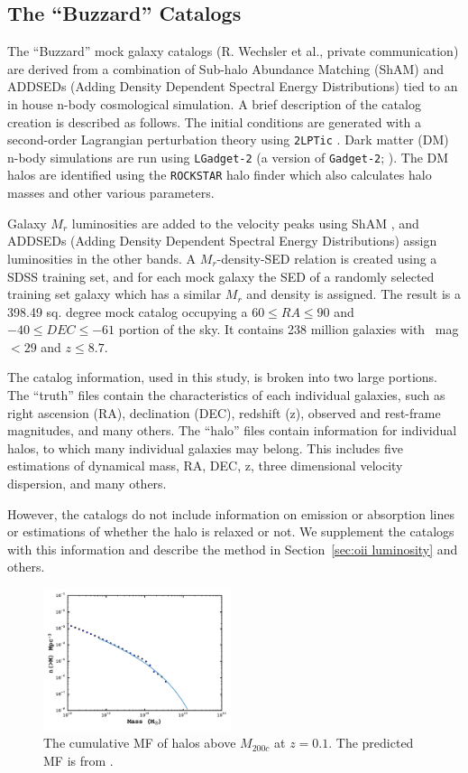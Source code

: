 \documentclass[apj, revtex4]{emulateapj}
\begin{document}
\subsection{The ``Buzzard'' Catalogs}
The ``Buzzard'' mock galaxy catalogs (R. Wechsler et al., private communication) are derived from a combination of Sub-halo Abundance Matching (ShAM) and ADDSEDs (Adding Density Dependent Spectral Energy Distributions) tied to an in house n-body cosmological simulation. A brief description of the catalog creation is described as follows. The initial conditions are generated with a second-order Lagrangian perturbation theory using {\tt 2LPTic} \citep{Crocce2006}. Dark matter (DM) n-body simulations are run using {\tt LGadget-2} (a version of {\tt Gadget-2}; \citealt{Springel2005}). The DM halos are identified using the {\tt ROCKSTAR} halo finder \citep{Behroozi2013} which also calculates halo masses and other various parameters. 

Galaxy $M_r$ luminosities are added to the velocity peaks using ShAM \citep{Reddick2013}, and ADDSEDs (Adding Density Dependent Spectral Energy Distributions) assign luminosities in the other bands. A $M_r$-density-SED relation is created using a SDSS training set, and for each mock galaxy the SED of a randomly selected training set galaxy which has a similar $M_r$ and density is assigned. The result is a 398.49 sq. degree mock catalog occupying a $60 \leq RA \leq 90$ and $-40 \leq DEC \leq -61$ portion of the sky. It contains 238 million galaxies with \sdssr\ mag $< 29$ and $z \leq 8.7$.

The catalog information, used in this study, is broken into two large portions. The ``truth'' files contain the characteristics of each individual galaxies, such as right ascension (RA), declination (DEC), redshift (z), observed and rest-frame magnitudes, and many others. The ``halo'' files contain information for individual halos, to which many individual galaxies may belong. This includes five estimations of dynamical mass, RA, DEC, z, three dimensional velocity dispersion, and many others.

However, the catalogs do not include information on emission or absorption lines or estimations of whether the halo is relaxed or not. We supplement the catalogs with this information and describe the method in Section~\ref{sec:oii luminosity} and others.

\begin{figure} 
	\includegraphics[width=0.49\textwidth]{hmf.pdf} 
	\caption{The cumulative MF of halos above $M_{200c}$ at $z=0.1$. The predicted MF is from \cite{Tinker2008}.} 
	\label{fig:hmf} 
\end{figure}
\end{document}
